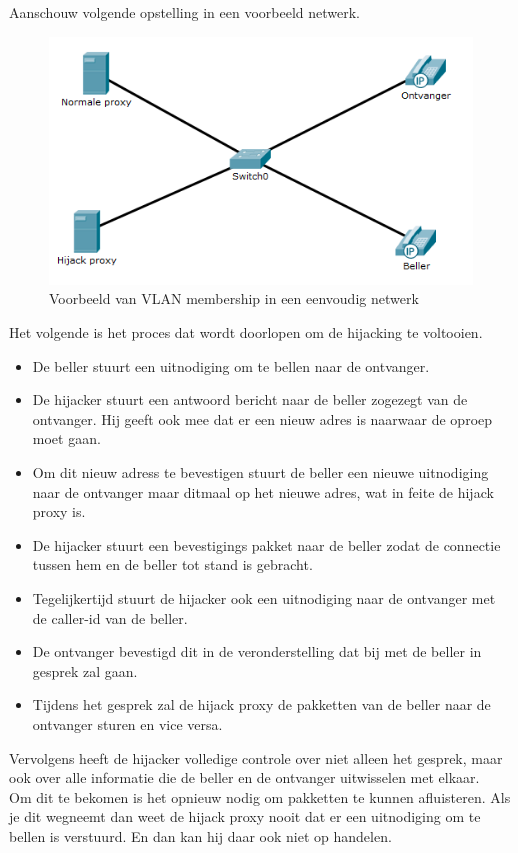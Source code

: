 \documentclass[pdftex,a4paper,12pt,twoside]{report}
\begin{document}
Aanschouw volgende opstelling in een voorbeeld netwerk.
\begin{figure}[H]
\caption{Voorbeeld van VLAN membership in een eenvoudig netwerk \protect \footnotemark}
\includegraphics[scale=0.7]{img/Hijack}
\end{figure}
Het volgende is het proces dat wordt doorlopen om de hijacking te voltooien.
\begin{itemize}
	\item De beller stuurt een uitnodiging om te bellen naar de ontvanger.
	\item De hijacker stuurt een antwoord bericht naar de beller zogezegt van de ontvanger. Hij geeft ook mee dat er een nieuw adres is naarwaar de oproep moet gaan.
	\item Om dit nieuw adress te bevestigen stuurt de beller een nieuwe uitnodiging naar de ontvanger maar ditmaal op het nieuwe adres, wat in feite de hijack proxy is.
	\item De hijacker stuurt een bevestigings pakket naar de beller zodat de connectie tussen hem en de beller tot stand is gebracht. 
	\item Tegelijkertijd stuurt de hijacker ook een uitnodiging naar de ontvanger met de caller-id van de beller.
	\item De ontvanger bevestigd dit in de veronderstelling dat bij met de beller in gesprek zal gaan.
	\item Tijdens het gesprek zal de hijack proxy de pakketten van de beller naar de ontvanger sturen en vice versa. 
\end{itemize}
\newpage
Vervolgens heeft de hijacker volledige controle over niet alleen het gesprek, maar ook over alle informatie die de beller en de ontvanger uitwisselen met elkaar. \\
Om dit te bekomen is het opnieuw nodig om pakketten te kunnen afluisteren. Als je dit wegneemt dan weet de hijack proxy nooit dat er een uitnodiging om te bellen is verstuurd. En dan kan hij daar ook niet op handelen.
\end{document}
